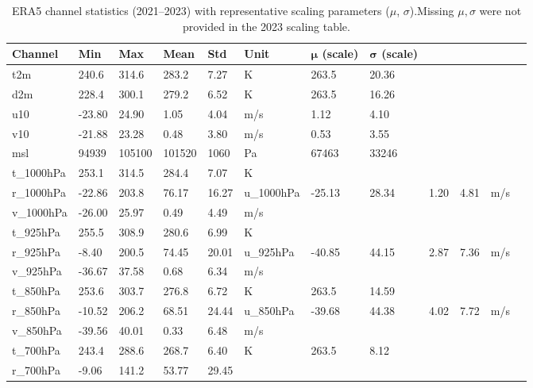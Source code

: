 \begin{table}[h]
    \centering
    \caption{ERA5 channel statistics (2021--2023) with representative scaling parameters ($\mu$, $\sigma$).\newline \small Missing $\mu,\sigma$ were not provided in the 2023 scaling table.}
    \begin{tabular}{p{2.5cm}p{1.6cm}p{1.6cm}p{1.6cm}p{1.6cm}p{1.1cm}p{1.5cm}p{1.5cm}}
        \toprule
        \textbf{Channel} & \textbf{Min} & \textbf{Max} & \textbf{Mean} & \textbf{Std} & \textbf{Unit} & $\boldsymbol{\mu}$ \textbf{(scale)} & $\boldsymbol{\sigma}$ \textbf{(scale)}\\
        \midrule
        t2m & 240.6 & 314.6 & 283.2 & 7.27 & K & 263.5 & 20.36 \\
        d2m & 228.4 & 300.1 & 279.2 & 6.52 & K & 263.5 & 16.26 \\
        u10 & -23.80 & 24.90 & 1.05 & 4.04 & m/s & 1.12 & 4.10 \\
        v10 & -21.88 & 23.28 & 0.48 & 3.80 & m/s & 0.53 & 3.55 \\
        msl & 94939 & 105100 & 101520 & 1060 & Pa & 67463 & 33246 \\
        t_1000hPa & 253.1 & 314.5 & 284.4 & 7.07 & K &  &  \\
        r_1000hPa & -22.86 & 203.8 & 76.17 & 16.27 & %
        u_1000hPa & -25.13 & 28.34 & 1.20 & 4.81 & m/s &  &  \\
        v_1000hPa & -26.00 & 25.97 & 0.49 & 4.49 & m/s &  &  \\
        t_925hPa & 255.5 & 308.9 & 280.6 & 6.99 & K &  &  \\
        r_925hPa & -8.40 & 200.5 & 74.45 & 20.01 & %
        u_925hPa & -40.85 & 44.15 & 2.87 & 7.36 & m/s &  &  \\
        v_925hPa & -36.67 & 37.58 & 0.68 & 6.34 & m/s &  &  \\
        t_850hPa & 253.6 & 303.7 & 276.8 & 6.72 & K & 263.5 & 14.59 \\
        r_850hPa & -10.52 & 206.2 & 68.51 & 24.44 & %
        u_850hPa & -39.68 & 44.38 & 4.02 & 7.72 & m/s &  &  \\
        v_850hPa & -39.56 & 40.01 & 0.33 & 6.48 & m/s &  &  \\
        t_700hPa & 243.4 & 288.6 & 268.7 & 6.40 & K & 263.5 & 8.12 \\
        r_700hPa & -9.06 & 141.2 & 53.77 & 29.45 & %

\end{tabular}
\end{table}
